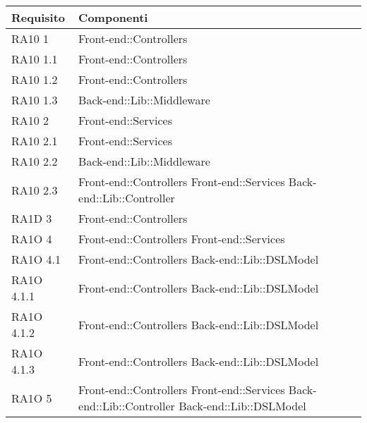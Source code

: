       \begin{center}
      \bgroup
      \def\arraystretch{1.8}
      \begin{longtable}{|p{3cm}|p{5cm}|}
    
      \cellcolor[gray]{0.9} \textbf{Requisito} & \cellcolor[gray]{0.9} \textbf{Componenti}  \\ \hline
      
      RA10 1 & Front-end::Controllers \\ \hline
      RA10 1.1 & Front-end::Controllers \\ \hline
      RA10 1.2 & Front-end::Controllers \\ \hline
      RA10 1.3 & Back-end::Lib::Middleware \\ \hline
      RA10 2 & Front-end::Services \\ \hline
      RA10 2.1 & Front-end::Services \\ \hline
      RA10 2.2 & Back-end::Lib::Middleware \\ \hline
      RA10 2.3 & Front-end::Controllers \newline
      			Front-end::Services \newline
      			Back-end::Lib::Controller \\ \hline
      RA1D 3 & Front-end::Controllers \\ \hline
      RA1O 4 & Front-end::Controllers \newline
      			Front-end::Services \\ \hline
      RA1O 4.1 & Front-end::Controllers \newline
      			Back-end::Lib::DSLModel \\ \hline
      RA1O 4.1.1 & Front-end::Controllers \newline
      			Back-end::Lib::DSLModel \\ \newline
      RA1O 4.1.2 & Front-end::Controllers \newline
      			Back-end::Lib::DSLModel \\ \hline
      RA1O 4.1.3 & Front-end::Controllers \newline
      				Back-end::Lib::DSLModel \\ \hline
      RA1O 5 & Front-end::Controllers \newline
      			Front-end::Services \newline
      			Back-end::Lib::Controller \newline
      			Back-end::Lib::DSLModel \\ \hline

\end{longtable}
\end{center}
